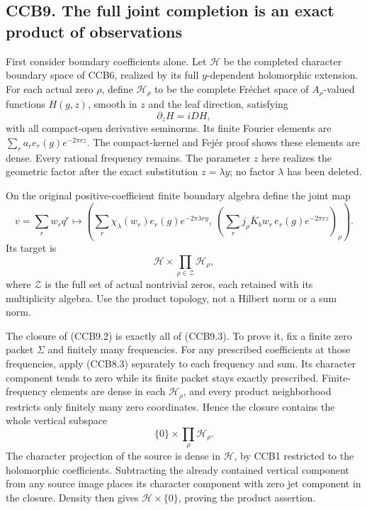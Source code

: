 \subsection{CCB9. The full joint completion is an exact product of
observations}\label{ccb9.-the-full-joint-completion-is-an-exact-product-of-observations}

First consider boundary coefficients alone. Let \(\mathcal H\) be the
completed character boundary space of CCB6, realized by its full
\(y\)-dependent holomorphic extension. For each actual zero \(\rho\),
define \(\mathcal H_\rho\) to be the complete Fréchet space of
\(A_\rho\)-valued functions \(H(g,z)\), smooth in \(z\) and the leaf
direction, satisfying \[
\partial_zH=iDH,
\tag{CCB9.1}
\] with all compact-open derivative seminorms. Its finite Fourier
elements are \(\sum_r a_re_r(g)e^{-2\pi rz}\). The compact-kernel and
Fejér proof shows these elements are dense. Every rational frequency
remains. The parameter \(z\) here realizes the geometric factor after
the exact substitution \(z=\lambda y\); no factor \(\lambda\) has been
deleted.

On the original positive-coefficient finite boundary algebra define the
joint map \[
v=\sum_r w_rq^r\longmapsto
\left(
\sum_r\chi_\lambda(w_r)e_r(g)e^{-2\pi\lambda ry},\
\left(\sum_rj_\rho\overline K_bw_r\,e_r(g)e^{-2\pi rz}\right)_{\rho}
\right).
\tag{CCB9.2}
\] Its target is \[
\mathcal H\times\prod_{\rho\in\mathcal Z}\mathcal H_\rho,
\tag{CCB9.3}
\] where \(\mathcal Z\) is the full set of actual nontrivial zeros, each
retained with its multiplicity algebra. Use the product topology, not a
Hilbert norm or a sum norm.

The closure of (CCB9.2) is exactly all of (CCB9.3). To prove it, fix a
finite zero packet \(\Sigma\) and finitely many frequencies. For any
prescribed coefficients at those frequencies, apply (CCB8.3) separately
to each frequency and sum. Its character component tends to zero while
its finite packet stays exactly prescribed. Finite-frequency elements
are dense in each \(\mathcal H_\rho\), and every product neighborhood
restricts only finitely many zero coordinates. Hence the closure
contains the whole vertical subspace \[
\{0\}\times\prod_\rho\mathcal H_\rho.
\] The character projection of the source is dense in \(\mathcal H\), by
CCB1 restricted to the holomorphic coefficients. Subtracting the already
contained vertical component from any source image places its character
component with zero jet component in the closure. Density then gives
\(\mathcal H\times\{0\}\), proving the product assertion.

